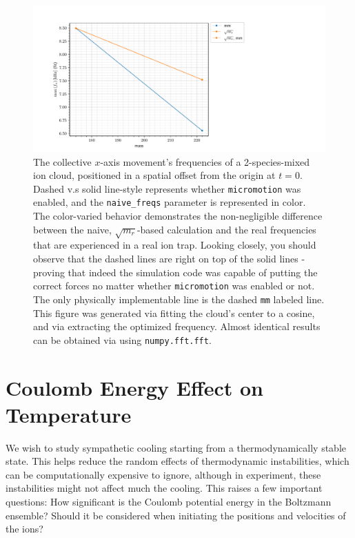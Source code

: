 \begin{figure}
	\begin{center}
		\includegraphics[width=1.2\textwidth]{graphics/micromotion_and_sqrt_freqs_effect.pdf}
	\end{center}
	\caption{The collective $x$-axis movement's frequencies of a 2-species-mixed ion cloud, positioned in a spatial offset from the origin at $t=0$. Dashed v.s solid line-style represents whether \texttt{micromotion} was enabled, and the \texttt{naive\_freqs} parameter is represented in color. The color-varied behavior demonstrates the non-negligible difference between the naive, $\sqrt{m_r}$-based calculation and the real frequencies that are experienced in a real ion trap. Looking closely, you should observe that the dashed lines are right on top of the solid lines - proving that indeed the simulation code was capable of putting the correct forces no matter whether \texttt{micromotion} was enabled or not. The only physically implementable line is the dashed \texttt{mm} labeled line. This figure was generated via fitting the cloud's center to a cosine, and via extracting the optimized frequency. Almost identical results can be obtained via using \texttt{numpy.fft.fft}\cite{numpy}.}
	\label{fig:LAMMPS_summarized_naive_freqs-micromotion}
\end{figure}

\section{Coulomb Energy Effect on Temperature}\label{sec:comp/coulomb}

We wish to study sympathetic cooling starting from a thermodynamically stable state. This helps reduce the random effects of thermodynamic instabilities, which can be computationally expensive to ignore, although in experiment, these instabilities might not affect much the cooling. This raises a few important questions: How significant is the Coulomb potential energy in the Boltzmann ensemble? Should it be considered when initiating the positions and velocities of the ions?

